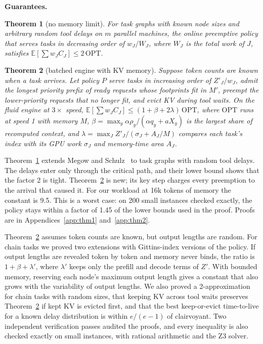 \documentclass{article}
\newtheorem{theorem}{Theorem}
\newcommand{\OPT}{\mathrm{OPT}}
\begin{document}
\textbf{Guarantees.}
\begin{theorem}[no memory limit]
\label{thm:nomem}
For task graphs with known node sizes and arbitrary random tool delays on $m$ parallel machines, the online
preemptive policy that serves tasks in decreasing order of $w_J/W_J$, where $W_J$ is the total work of $J$,
satisfies $\mathbb{E}[\sum w_J C_J] \le 2\,\OPT$.
\end{theorem}
\begin{theorem}[batched engine with KV memory]
\label{thm:kv}
Suppose token counts are known when a task arrives. Let policy $P$ serve tasks in increasing order of $Z'_J/w_J$,
admit the longest priority prefix of ready requests whose footprints fit in $M'$, preempt the lower-priority
requests that no longer fit, and evict KV during tool waits. On the fluid engine at $3\times$ speed,
$\mathbb{E}[\sum w_J C_J] \le (1 + \beta + 2\lambda)\,\OPT$, where $\OPT$ runs at speed 1 with memory $M$,
$\beta = \max_y \alpha\rho_y/(\alpha q_y + aX_y)$ is the largest share of recomputed context, and
$\lambda = \max_J Z'_J/(\sigma_J + A_J/M)$ compares each task's index with its GPU work $\sigma_J$ and memory-time
area $A_J$.
\end{theorem}
Theorem~\ref{thm:nomem} extends Megow and Schulz~\cite{megow2004online} to task graphs with random tool delays.
The delays enter only through the critical path, and their lower bound shows that the factor 2 is tight.
Theorem~\ref{thm:kv} is new; its key step charges every preemption to the arrival that caused it. For our workload
at 16k tokens of memory the constant is 9.5. This is a worst case: on 200 small instances checked exactly, the
policy stays within a factor of 1.45 of the lower bounds used in the proof. Proofs are in
Appendices~\ref{app:thm1} and~\ref{app:thm2}.

Theorem~\ref{thm:kv} assumes token counts are known, but output lengths are random. For chain tasks we proved two
extensions with Gittins-index versions of the policy. If output lengths are revealed token by token and memory
never binds, the ratio is $1 + \beta + \lambda'$, where $\lambda'$ keeps only the prefill and decode terms of $Z'$.
With bounded memory, reserving each node's maximum output length gives a constant that also grows with the
variability of output lengths. We also proved a 2-approximation for chain tasks with random sizes, that keeping KV
across tool waits preserves Theorem~\ref{thm:kv} if kept KV is evicted first, and that the best keep-or-evict
time-to-live for a known delay distribution is within $e/(e-1)$ of clairvoyant. Two independent verification
passes audited the proofs, and every inequality is also checked exactly on small instances, with rational
arithmetic and the Z3 solver.
\end{document}
